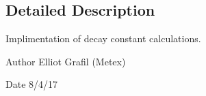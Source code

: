 \subsection{Detailed Description}
Implimentation of decay constant calculations. 

\begin{DoxyAuthor}{Author}
Elliot Grafil (Metex) 
\end{DoxyAuthor}
\begin{DoxyDate}{Date}
8/4/17 
\end{DoxyDate}
